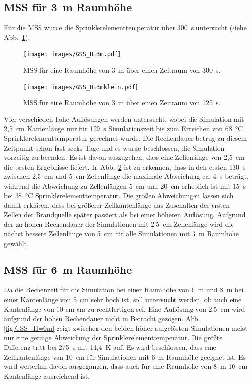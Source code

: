\subsection{MSS für 3~m Raumhöhe}

Für die MSS wurde die Sprinklerelementtemperatur über 300~s untersucht (siehe Abb.~\ref{fig:MSS}). 
\begin{figure}[b]
    \centering
    \texttt{[image: images/GSS\_H=3m.pdf]}
    \caption{MSS für eine Raumhöhe von 3~m über einen Zeitraum von 300~s.}
    \label{fig:MSS}
\end{figure}
\begin{figure}
    \centering
    \texttt{[image: images/GSS\_H=3mklein.pdf]}
    \caption{MSS für eine Raumhöhe von 3~m über einen Zeitraum von 125~s.}
    \label{fig:MSSklein}
\end{figure}
Vier verschieden hohe Auflösungen werden untersucht, wobei die Simulation mit 2,5~cm Kantenlänge nur für 129~s Simulationszeit bis zum Erreichen von 68~°C Sprinklerelementtemperatur gerechnet wurde. Die Rechendauer betrug zu diesem Zeitpunkt schon fast sechs Tage und es wurde beschlossen, die Simulation vorzeitig zu beenden. Es ist davon auszugehen, dass eine Zellenlänge von 2,5~cm die besten Ergebnisse liefert. In Abb.~\ref{fig:MSSklein} ist zu erkennen, dass in den ersten 130~s zwischen 2,5~cm und 5~cm Zellenlänge die maximale Abweichung ca. 4~s beträgt, während die Abweichung zu Zellenlängen 5~cm und 20~cm erheblich ist mit 15~s bei 38~°C Sprinklerelementtemperatur. Die großen Abweichungen lassen sich damit erklären, dass bei größerer Zellkantenlänge das Zuschalten der ersten Zellen der Brandquelle später passiert als bei einer höheren Auflösung. Aufgrund der zu hohen Rechendauer der Simulationen mit 2,5~cm Zellenlänge wird die nächst bessere Zellenlänge von 5~cm für alle Simulationen mit 3~m Raumhöhe gewählt. 


\subsection{MSS für 6~m Raumhöhe}

Da die Rechenzeit für die Simulation bei einer Raumhöhe von 6~m und 8~m bei einer Kantenlänge von 5~cm sehr hoch ist, soll untersucht werden, ob auch eine Kantenlänge von 10 cm  cm zu rechtfertigen sei. Eine Auflösung von 2,5~cm wird aufgrund der hohen Rechendauer nicht in Betracht gezogen.
Abb. \ref{fig:GSS_H=6m} zeigt zwischen den beiden höher aufgelösten Simulationen meist nur eine geringe Abweichung der Sprinklerelementtemperatur. Die größte Differenz tritt bei 275~s mit 11,4~K auf. Es wird beschlossen, dass eine Zellkantenlänge von 10~cm für Simulationen mit 6~m Raumhöhe geeignet ist. Es wird weiterhin davon ausgegangen, dass auch für eine Raumhöhe von 8~m 10~cm Kantenlänge ausreichend ist.

